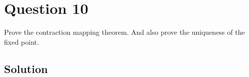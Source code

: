 \section*{Question 10}

Prove the contraction mapping theorem.
And also prove the uniqueness of the fixed point.

\subsection*{Solution}
